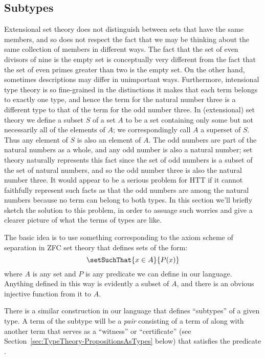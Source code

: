 \subsection{Subtypes}
\label{sec:TypeTheory-Subtypes}

Extensional set theory does not distinguish between sets that have the same members, and so does not respect the fact that we may be thinking about the same collection of members in different ways. The fact that the set of even divisors of nine is the empty set is conceptually very different from the fact that the set of even primes greater than two is the empty set.  On the other hand, sometimes descriptions may differ in unimportant ways.  Furthermore, intensional type theory is so fine-grained in the distinctions it makes that each term belongs to exactly one type, and hence the term for the natural number three is a different type to that of the term for the odd number three. In (extensional) set theory we define a subset $S$ of a set $A$ to be a set containing only some but not necessarily all of the elements of $A$; we correspondingly call $A$ a superset of $S$.  Thus any element of $S$ is also an element of $A$. The odd numbers are part of the natural numbers as a whole, and any odd number is also a natural number; set theory naturally represents this fact since the set of odd numbers is a subset of the set of natural numbers, and so the odd number three is also the natural number three. It would appear to be a serious problem for HTT if it cannot faithfully represent such facts as that the odd numbers are among the natural numbers because no term can belong to both types. In this section we'll briefly sketch the solution to this problem, in order to assuage such worries and give a clearer picture of what the terms of types are like.

The basic idea is to use something corresponding to the axiom scheme of separation in ZFC set theory that defines sets of the form:
\[
\setSuchThat{x \in A}{P(x)}
\]
where $A$ is any set and $P$ is any predicate we can define in our language. Anything defined in this way is evidently a subset of $A$, and there is an obvious injective function from it to $A$.

There is a similar construction in our language that defines ``subtypes'' of a given type. A term of the subtype will be a \emph{pair} consisting of a term  of  along with another term that serves as a ``witness'' or ``certificate'' (see Section~\ref{sec:TypeTheory-PropositionsAsTypes} below) that  satisfies the predicate .    

